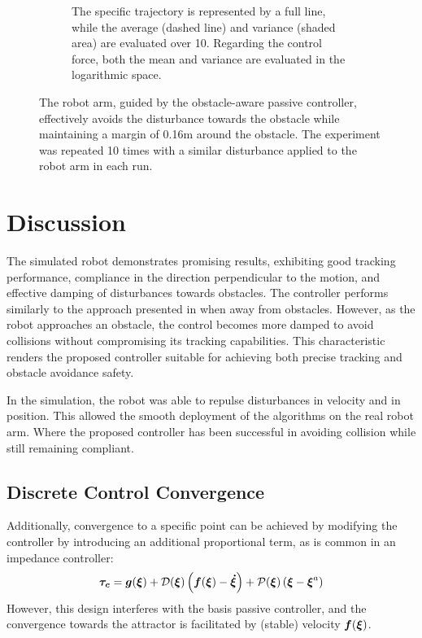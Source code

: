 \begin{figure}
\begin{subfigure}{\columnwidth}
      \caption{The specific trajectory is represented by a full line, while the average (dashed line) and variance (shaded area) are evaluated over 10.  Regarding the control force, both the mean and variance are evaluated in the logarithmic space.}
      \label{fig:trajectory_comparison_force_and_distance}
    \end{subfigure}
	\caption{
The robot arm, guided by the obstacle-aware passive controller, effectively avoids the disturbance towards the obstacle while maintaining a margin of 0.16m around the obstacle. The experiment was repeated 10 times with a similar disturbance applied to the robot arm in each run.
 }  
    \label{fig:evaluation_on_robot_arm}
\end{figure}

\section{Discussion}
The simulated robot demonstrates promising results, exhibiting good tracking performance, compliance in the direction perpendicular to the motion, and effective damping of disturbances towards obstacles. The controller performs similarly to the approach presented in \cite{kronander2015passive} when away from obstacles. However, as the robot approaches an obstacle, the control becomes more damped to avoid collisions without compromising its tracking capabilities. This characteristic renders the proposed controller suitable for achieving both precise tracking and obstacle avoidance safety.

In the simulation, the robot was able to repulse disturbances in velocity and in position. This allowed the smooth deployment of the algorithms on the real robot arm. Where the proposed controller has been successful in avoiding collision while still remaining compliant.

\subsection{Discrete Control Convergence}
Additionally, convergence to a specific point can be achieved by modifying the controller by introducing an additional proportional term, as is common in an impedance controller:
\begin{equation}
	\vecs{\tau_c} = \vect g (\vecs\xi) 
	+ \matd{D}(\vecs\xi) \left(\vecs f(\vecs\xi) - \vecs{\dot\xi} \right) 
	+ \matd{P}(\vecs \xi) \left(\vecs \xi - \vecs \xi^a \right)
\label{eq:control_command_proportional}
\end{equation}
However, this design interferes with the basis passive controller, and the convergence towards the attractor is facilitated by (stable) velocity $\boldsymbol{f}(\boldsymbol{\xi})$. 


